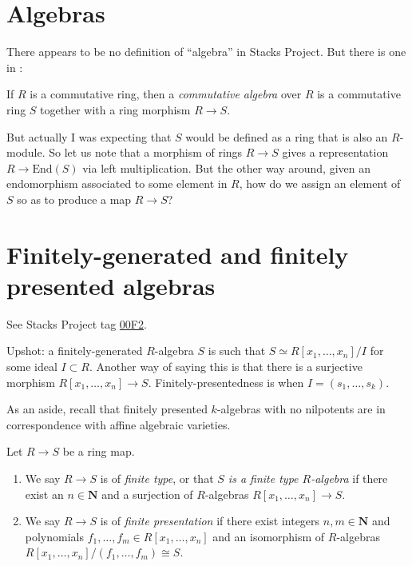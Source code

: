 \noindent


\section{Algebras}
\label{section-algebras}

\noindent
There appears to be no definition of ``algebra''
in Stacks Project.
But there is one in \cite{Eisenbud}:

\begin{definition}
\label{definition-algebra}
If $R$ is a commutative ring,
then a {\it commutative algebra} over $R$ 
is a commutative ring $S$ together
with a ring morphism $R \to S$.
\end{definition}

\noindent
But actually I was expecting that 
$S$ would be defined as 
a ring that is also an $R$-module.
So let us note that a morphism of rings
$R \to S$ gives a representation
$R \to \text{End}(S)$ via left multiplication.
But the other way around,
given an endomorphism associated
to some element in $R$,
how do we assign an element of $S$
so as to produce a map $R \to S$?

\section{Finitely-generated and finitely presented algebras}
\label{section-finitely-presented-generated}

\noindent
See Stacks Project tag \href{https://stacks.math.columbia.edu/tag/00F2}{00F2}.

Upshot: a finitely-generated $R$-algebra $S$ is such that
$S \simeq R[x_1,\ldots,x_n]/I$ for some ideal $I \subset R$.
Another way of saying this is that there is a surjective morphism
$R[x_1,…,x_n]\to S$.
Finitely-presentedness is when $I = (s_1,\ldots,s_k)$.

As an aside, recall that finitely presented $k$-algebras
with no nilpotents are in correspondence with affine algebraic varieties.

\begin{definition}
\label{definition-finite-type}
Let $R \to S$ be a ring map.
\begin{enumerate}
\item We say $R \to S$ is of {\it finite type}, or that {\it $S$ is a finite
type $R$-algebra} if there exist an $n \in \mathbf{N}$ and a surjection
of $R$-algebras $R[x_1, \ldots, x_n] \to S$.
\item We say $R \to S$ is of {\it finite presentation} if there
exist integers $n, m \in \mathbf{N}$ and polynomials
$f_1, \ldots, f_m \in R[x_1, \ldots, x_n]$
and an isomorphism of $R$-algebras
$R[x_1, \ldots, x_n]/(f_1, \ldots, f_m) \cong S$.
\end{enumerate}
\end{definition}

